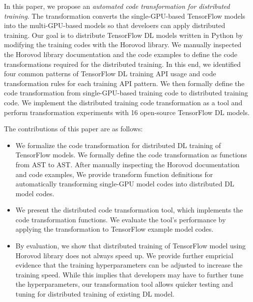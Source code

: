 In this paper, we propose an 
\textit{automated code transformation for distributed training}.
The transformation converts the single-GPU-based TensorFlow models
into the multi-GPU-based models so that develoers can apply 
distributed training.
Our goal is to distribute TensorFlow DL models written in Python
by modifying the training codes with the Horovod library.
We manually inspected the Horovod library documentation and
the code examples to define the code transformations required for
the distributed training. In this end, we identified four common patterns of
TensorFlow DL training API usage and code transformation rules
for each training API pattern. 
We then formally define the code transformation from
single-GPU-based training code to distributed training code.
We implement the distributed training code transformation as a tool
and perform transformation experiments with 16 open-source TensorFlow DL models. 

The contributions of this paper are as follows:

\begin{itemize}
  \item We formalize the code transformation for distributed DL training
        of TensorFlow models. We formally define the code transformation
        as functions from AST to AST. After manually inspecting
        the Horovod documentation and code examples,
        We provide transform function definitions for 
        automatically transforming single-GPU model codes into
        distributed DL model codes.

  \item We present the distributed code transformation tool, which implements
        the code transformation functions. We evaluate the tool's performance
        by applying the transformation to TensorFlow example model codes.

  \item By evaluation, we show that distributed training of TensorFlow
    model using Horovod library does not always
    speed up. We provide further empricial evidence that the training
    hyperparameters can be adjusted to increase the training speed.
    While this implies that developers may have to further tune the
    hyperparameters, our transformation tool allows quicker testing and
    tuning for distributed training of existing DL model. 

\end{itemize}
